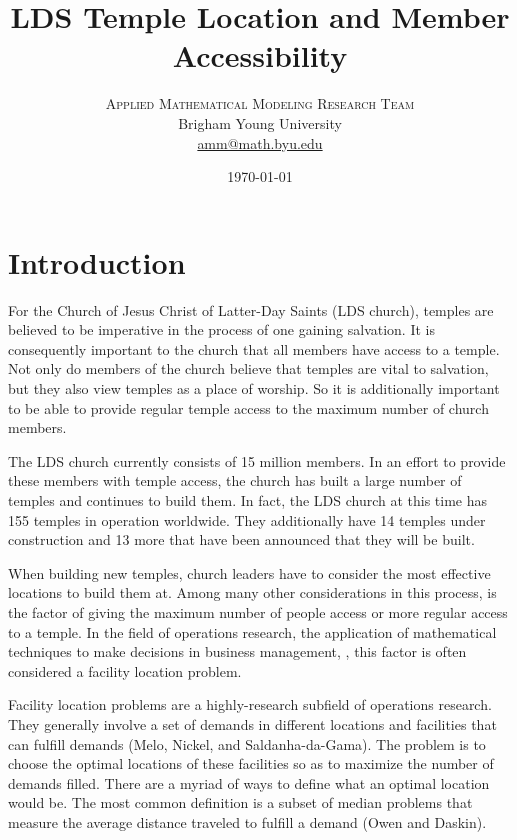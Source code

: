 \documentclass[twoside,twocolumn]{article}
\title{LDS Temple Location and Member Accessibility} %
\author{%
\textsc{Applied Mathematical Modeling Research Team}\\[1ex] %
\normalsize Brigham Young University  \\ %
\normalsize \href{mailto:amm@math.byu.edu}{amm@math.byu.edu} %
}
\date{\today} %
\begin{document}
\maketitle



\section{Introduction}

For the Church of Jesus Christ of Latter-Day Saints (LDS church), temples are believed to be imperative in the process of one gaining salvation.
It is consequently important to the church that all members have access to a temple.
Not only do members of the church believe that temples are vital to salvation, but they also view temples as a place of worship.
So it is additionally important to be able to provide regular temple access to the maximum number of church members.

The LDS church currently consists of 15 million members.
In an effort to provide these members with temple access, the church has built a large number of temples and continues to build them.
In fact, the LDS church at this time has 155 temples in operation worldwide. 
They additionally have 14 temples under construction and 13 more that have been announced that they will be built.

When building new temples, church leaders have to consider the most effective locations to build them at.
Among many other considerations in this process, is the factor of giving the maximum number of people access or more regular access to a temple.
In the field of operations research, the application of mathematical techniques to make decisions in business management,
, this factor is often considered a facility location problem.

Facility location problems are a highly-research subfield of operations research. 
They generally involve a set of demands in different locations and facilities that can fulfill demands (Melo, Nickel, and Saldanha-da-Gama). %
The problem is to choose the optimal locations of these facilities so as to maximize the number of demands filled.
There are a myriad of ways to define what an optimal location would be.
The most common definition is a subset of median problems that measure the average distance traveled to fulfill a demand (Owen and Daskin). %
\end{document}
